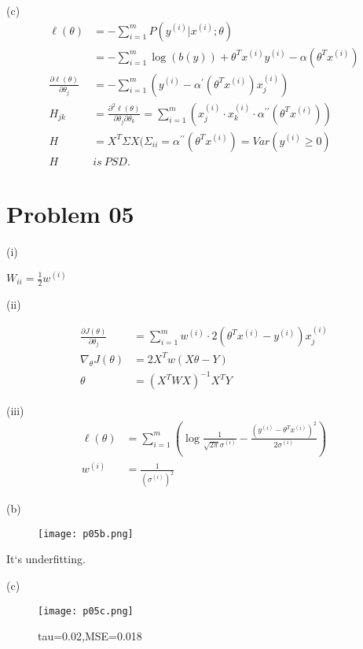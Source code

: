 \documentclass{article}
\begin{document}
(c) 
\begin{align*}
    \ell(\theta)&=-\sum_{i=1}^m P(y^{(i)}|x^{(i)};\theta)\\
    &=-\sum_{i=1}^m \log(b(y))+\theta^Tx^{(i)}y^{(i)}-\alpha(\theta^Tx^{(i)})\\
    \frac{\partial \ell(\theta)}{\partial \theta_j}&=-\sum_{i=1}^{m} (y^{(i)}-\alpha^{\prime}(\theta^Tx^{(i)})x^{(i)}_j)\\
    H_{jk}&=\frac{\partial^2\ell(\theta)}{\partial\theta_j\partial\theta_k}=\sum_{i=1}^m(x_j^{(i)}\cdot x^{(i)}_k\cdot \alpha^{\prime\prime}
    (\theta^Tx^{(i)}))\\
    H&=X^T \Sigma X (\Sigma_{ii}=\alpha^{\prime\prime}(\theta^Tx^{(i)})=Var(y^{(i)}\geq 0)\\
    H\  &is\  PSD.
\end{align*}

\newpage

\section{Problem 05}

(i)

$W_{ii}=\frac{1}{2}w^{(i)}$

(ii)

\begin{align*}
    \frac{\partial J(\theta)}{\partial \theta_j}&=\sum_{i=1}^m w^{(i)}\cdot 2(\theta^T x^{(i)}-y^{(i)})x_j^{(i)}\\
    \nabla_\theta J(\theta)&=2 X^Tw(X\theta -Y)\\
    \theta&=(X^TWX)^{-1}X^TY
\end{align*}

(iii)
\begin{align*}
    \ell(\theta)&=\sum_{i=1}^m (\log \frac{1}{\sqrt{2\pi}\sigma^{(i)}}-\frac{(y^{(i)}-\theta^Tx^{(i)})^2}{2\sigma^{(i)}})\\
    w^{(i)}&=\frac{1}{(\sigma^{(i)})^2}
\end{align*}

(b)
\begin{figure}[H]
    \centering
    \texttt{[image: p05b.png]}
\end{figure}

It‘s underfitting.

(c)
\begin{figure}[H]
    \centering
    \texttt{[image: p05c.png]}
    \caption{tau=0.02,MSE=0.018}
\end{figure}
\end{document}

